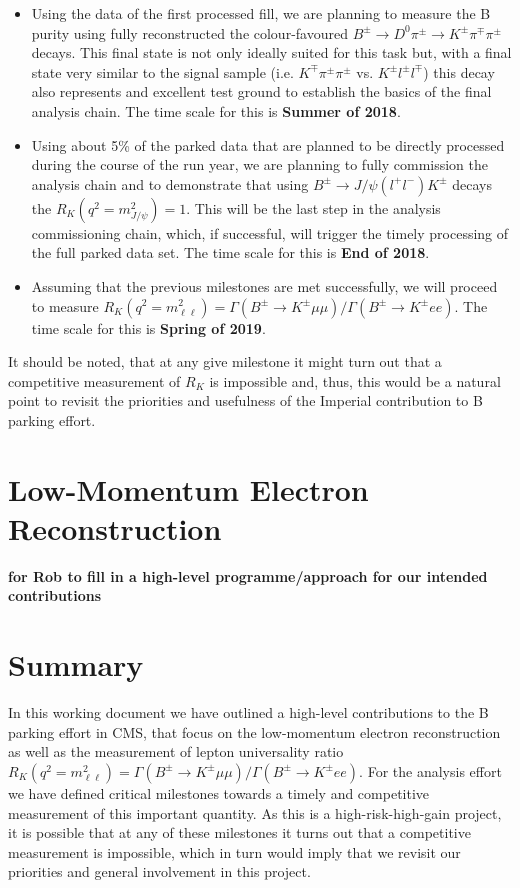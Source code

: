 \documentclass[a4paper,11pt]{article}
\begin{document}
\begin{itemize} 
\item Using the data of the first processed fill, we are planning to measure the B purity using fully reconstructed the colour-favoured $B^{\pm} \rightarrow D^0 \pi^{\pm} \rightarrow K^{\pm}  \pi^{\mp} \pi^{\pm}$ decays. This final state is not only ideally suited for this task but, with a final state very similar to the signal sample (i.e.  $K^{\mp}  \pi^{\pm} \pi^{\pm}$ vs. $K^{\pm}  l^{\pm} l^{\mp}$) this decay also represents and excellent test ground to establish the basics of the final analysis chain. The time scale for this is {\bf Summer of 2018}. 

\item  Using about 5\% of the parked data that are planned to be directly processed during the course of the run year, we are planning to fully commission the analysis chain and to demonstrate that using $B^{\pm} \rightarrow J/\psi(l^+l^-)  K^{\pm}$ decays the $R_{K} (q^2 = m_{J/\psi}^2) =1$. This will be the last step in the analysis commissioning chain, which, if successful, will trigger the timely processing of the full parked data set. The time scale for this is {\bf End of 2018}. 

\item Assuming that the previous milestones are met successfully, we will proceed to measure $R_{K} (q^2 = m_{\ell\ell}^2)= \Gamma (B^{\pm} \rightarrow K^{\pm} \mu \mu )/\Gamma (B^{\pm} \rightarrow K^{\pm}  e e)$.   The time scale for this is {\bf Spring of 2019}.

\end{itemize}

It should be noted, that at any give milestone it might turn out that a competitive measurement of $R_{K}$ is impossible and, thus, this would be a natural point to revisit the priorities and usefulness of the Imperial contribution to B parking effort.   


\section{Low-Momentum Electron Reconstruction}\label{electron}
{\bf for Rob to fill in a high-level programme/approach for our intended contributions} 

\section{Summary}
In this working document we have outlined a high-level contributions to the B parking effort in CMS, that focus on the low-momentum electron reconstruction as well as the measurement of lepton universality ratio $R_{K} (q^2 = m_{\ell\ell}^2)= \Gamma (B^{\pm} \rightarrow K^{\pm} \mu \mu )/\Gamma (B^{\pm} \rightarrow K^{\pm}  e e)$. For the analysis effort we have defined critical milestones towards a timely and competitive measurement of this important quantity. As this is a high-risk-high-gain project, it is possible that at any of these milestones it turns out that a competitive measurement is impossible, which in turn would imply that we revisit our priorities and general involvement in this project.   
\end{document}
